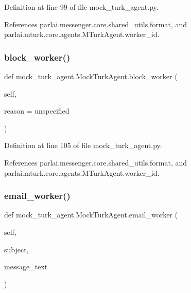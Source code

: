 Definition at line 99 of file mock\+\_\+turk\+\_\+agent.\+py.



References parlai.\+messenger.\+core.\+shared\+\_\+utils.\+format, and parlai.\+mturk.\+core.\+agents.\+M\+Turk\+Agent.\+worker\+\_\+id.

\mbox{\label{classmock__turk__agent_1_1MockTurkAgent_a4c1e39f383bd9a8e02ab8a44365202c8}} 
\subsubsection{\texorpdfstring{block\+\_\+worker()}{block\_worker()}}
{\footnotesize\ttfamily def mock\+\_\+turk\+\_\+agent.\+Mock\+Turk\+Agent.\+block\+\_\+worker (\begin{DoxyParamCaption}\item[{}]{self,  }\item[{}]{reason = {\ttfamily \textquotesingle{}unspecified\textquotesingle{}} }\end{DoxyParamCaption})}



Definition at line 105 of file mock\+\_\+turk\+\_\+agent.\+py.



References parlai.\+messenger.\+core.\+shared\+\_\+utils.\+format, and parlai.\+mturk.\+core.\+agents.\+M\+Turk\+Agent.\+worker\+\_\+id.

\mbox{\label{classmock__turk__agent_1_1MockTurkAgent_aa71a2a58ed436ab1c9a72f1296406706}} 
\subsubsection{\texorpdfstring{email\+\_\+worker()}{email\_worker()}}
{\footnotesize\ttfamily def mock\+\_\+turk\+\_\+agent.\+Mock\+Turk\+Agent.\+email\+\_\+worker (\begin{DoxyParamCaption}\item[{}]{self,  }\item[{}]{subject,  }\item[{}]{message\+\_\+text }\end{DoxyParamCaption})}



